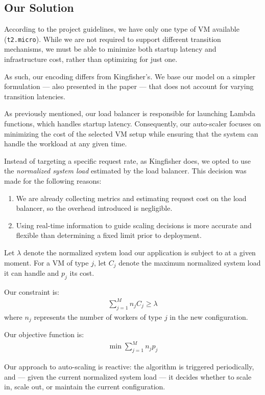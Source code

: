 \documentclass[conference]{IEEEtran}
\begin{document}
\subsection{Our Solution}

According to the project guidelines, we have only one type of VM available
(\texttt{t2.micro}). While we are not required to support different transition
mechanisms, we must be able to minimize both startup latency and infrastructure
cost, rather than optimizing for just one.

As such, our encoding differs from Kingfisher's. We base our model on a simpler
formulation --- also presented in the paper --- that does not account for
varying transition latencies.

As previously mentioned, our load balancer is responsible for launching Lambda
functions, which handles startup latency. Consequently, our auto-scaler focuses
on minimizing the cost of the selected VM setup while ensuring that the system
can handle the workload at any given time.

Instead of targeting a specific request rate, as Kingfisher does, we opted to
use the \textit{normalized system load} estimated by the load balancer. This
decision was made for the following reasons:
\begin{enumerate}
    \item We are already collecting metrics and estimating request cost on the
    load balancer, so the overhead introduced is negligible.
    \item Using real-time information to guide scaling decisions is more
    accurate and flexible than determining a fixed limit prior to deployment.
\end{enumerate}

Let $\lambda$ denote the normalized system load our application is subject to at
a given moment. For a VM of type $j$, let $C_j$ denote the maximum normalized
system load it can handle and $p_j$ its cost.

Our constraint is:
\begin{align}
    \sum_{j = 1}^M n_j C_j \ge \lambda
\end{align}
where $n_j$ represents the number of workers of type $j$ in the new
configuration.

Our objective function is:
\begin{align}
    \min \sum_{j = 1}^M n_j p_j
\end{align}

Our approach to auto-scaling is reactive: the algorithm is triggered
periodically, and --- given the current normalized system load --- it decides
whether to scale in, scale out, or maintain the current configuration.
\end{document}
